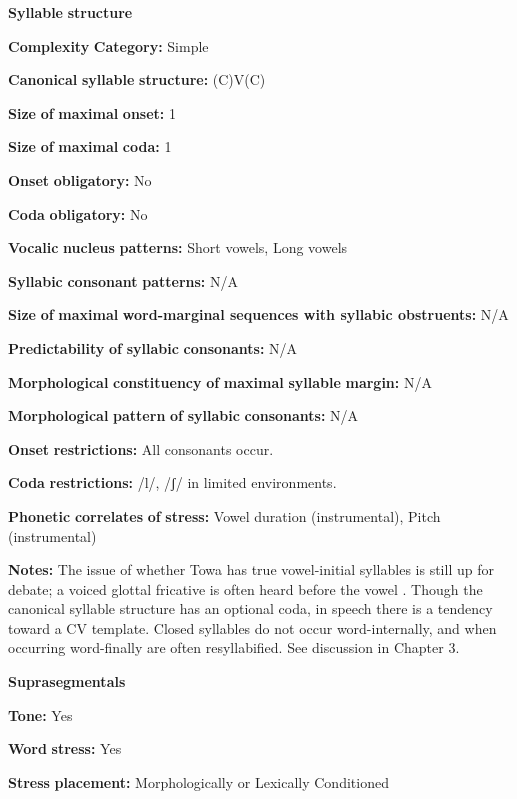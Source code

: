 \begin{styleBody}
\textbf{Syllable} \textbf{structure}

\textbf{Complexity} \textbf{Category:} Simple

\textbf{Canonical} \textbf{syllable} \textbf{structure:} (C)V(C) \citep[21-22]{Yumitani1998}

\textbf{Size} \textbf{of} \textbf{maximal} \textbf{onset:} 1

\textbf{Size} \textbf{of} \textbf{maximal} \textbf{coda:} 1

\textbf{Onset} \textbf{obligatory:} No

\textbf{Coda} \textbf{obligatory:} No

\textbf{Vocalic} \textbf{nucleus} \textbf{patterns:} Short vowels, Long vowels

\textbf{Syllabic} \textbf{consonant} \textbf{patterns:} N/A

\textbf{Size} \textbf{of} \textbf{maximal} \textbf{word{}-marginal sequences with syllabic obstruents:} N/A

\textbf{Predictability} \textbf{of} \textbf{syllabic} \textbf{consonants:} N/A

\textbf{Morphological} \textbf{constituency} \textbf{of} \textbf{maximal} \textbf{syllable} \textbf{margin:} N/A

\textbf{Morphological} \textbf{pattern} \textbf{of} \textbf{syllabic} \textbf{consonants:} N/A

\textbf{Onset} \textbf{restrictions:} All consonants occur.

\textbf{Coda} \textbf{restrictions:} /l/, /ʃ/ in limited environments.

\textbf{Phonetic} \textbf{correlates} \textbf{of} \textbf{stress:} Vowel duration (instrumental), Pitch (instrumental)

\textbf{Notes:} The issue of whether Towa has true vowel-initial syllables is still up for debate; a voiced glottal fricative is often heard before the vowel \citep[22-23]{Yumitani1998}. Though the canonical syllable structure has an optional coda, in speech there is a tendency toward a CV template. Closed syllables do not occur word-internally, and when occurring word-finally are often resyllabified. See discussion in Chapter 3.

\textbf{Suprasegmentals}

\textbf{Tone:} Yes

\textbf{Word} \textbf{stress:} Yes

\textbf{Stress} \textbf{placement:} Morphologically or Lexically Conditioned


\end{styleBody}
